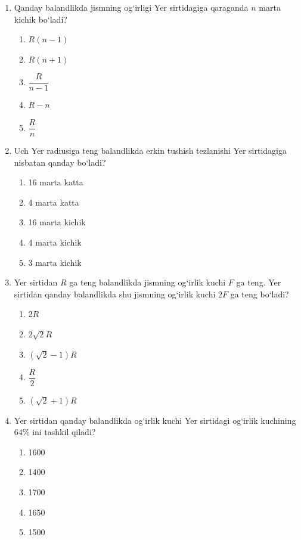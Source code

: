 \begin{enumerate}
\item Qanday balandlikda jismning og‘irligi Yer sirtidagiga qaraganda 
$n$ marta kichik bo‘ladi?

\begin{enumerate}[label=\Alph*)]
\item $R(n-1)$
\item $R(n+1)$
\item $\dfrac{R}{n-1}$
\item $R-n$
\item $\dfrac{R}{n}$
\end{enumerate}


\item Uch Yer radiusiga teng balandlikda erkin tushish tezlanishi 
Yer sirtidagiga nisbatan qanday bo‘ladi?

\begin{enumerate}[label=\Alph*)]
\item 16 marta katta
\item 4 marta katta
\item 16 marta kichik
\item 4 marta kichik
\item 3 marta kichik
\end{enumerate}


\item Yer sirtidan $R$ ga teng balandlikda jismning og‘irlik kuchi $F$ ga teng. 
Yer sirtidan qanday balandlikda shu jismning og‘irlik kuchi $2F$ ga teng bo‘ladi?



\begin{enumerate}[label=\Alph*)]
\item $2R$
\item $2\sqrt{2}R$
\item $(\sqrt{2}-1)R$
\item $\dfrac{R}{2}$
\item $(\sqrt{2}+1)R$
\end{enumerate}


\item Yer sirtidan qanday balandlikda og‘irlik kuchi 
Yer sirtidagi og‘irlik kuchining $64\%$ ini tashkil qiladi?

\begin{enumerate}[label=\Alph*)]
\item 1600
\item 1400
\item 1700
\item 1650
\item 1500
\end{enumerate}

\end{enumerate}